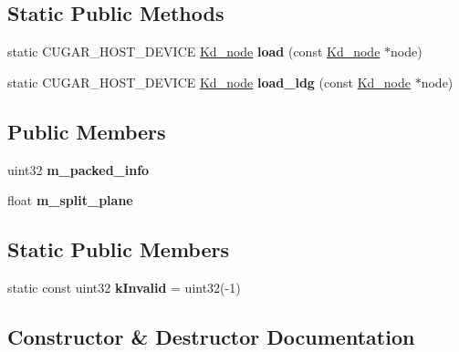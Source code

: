 \subsection*{Static Public Methods}
\begin{DoxyCompactItemize}
\item 
\mbox{\label{structcugar_1_1_kd__node_a0580b1321ca5d943dce5ec317286d2d7}} 
static C\+U\+G\+A\+R\+\_\+\+H\+O\+S\+T\+\_\+\+D\+E\+V\+I\+CE \hyperlink{structcugar_1_1_kd__node}{Kd\+\_\+node} {\bfseries load} (const \hyperlink{structcugar_1_1_kd__node}{Kd\+\_\+node} $\ast$node)
\item 
\mbox{\label{structcugar_1_1_kd__node_a82e2ebe295a5e0e0b03f7a0df9b7dcc2}} 
static C\+U\+G\+A\+R\+\_\+\+H\+O\+S\+T\+\_\+\+D\+E\+V\+I\+CE \hyperlink{structcugar_1_1_kd__node}{Kd\+\_\+node} {\bfseries load\+\_\+ldg} (const \hyperlink{structcugar_1_1_kd__node}{Kd\+\_\+node} $\ast$node)
\end{DoxyCompactItemize}
\subsection*{Public Members}
\begin{DoxyCompactItemize}
\item 
\mbox{\label{structcugar_1_1_kd__node_a70e07b3d82e630dc819e40d45d143115}} 
uint32 {\bfseries m\+\_\+packed\+\_\+info}
\item 
\mbox{\label{structcugar_1_1_kd__node_aaf6df8d45382425652f81651eed27668}} 
float {\bfseries m\+\_\+split\+\_\+plane}
\end{DoxyCompactItemize}
\subsection*{Static Public Members}
\begin{DoxyCompactItemize}
\item 
\mbox{\label{structcugar_1_1_kd__node_a69220c6051200b2f3c7c929d6b501ee3}} 
static const uint32 {\bfseries k\+Invalid} = uint32(-\/1)
\end{DoxyCompactItemize}


\subsection{Constructor \& Destructor Documentation}
\mbox{\label{structcugar_1_1_kd__node_ad5ead6ff07b97abd9aa634e7e9f99b7a}} 
